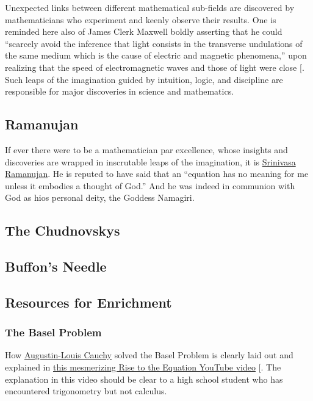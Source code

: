 \documentclass[
  a4paper,
]{article}
\begin{document}
Unexpected links between different mathematical sub-fields are
discovered by mathematicians who experiment and keenly observe their
results. One is reminded here also of James Clerk Maxwell boldly
asserting that he could ``scarcely avoid the inference that light
consists in the transverse undulations of the same medium which is the
cause of electric and magnetic phenomena,'' upon realizing that the
speed of electromagnetic waves and those of light were close
{[}\citeproc{ref-maxwell}{39}{]}. Such leaps of the imagination guided
by intuition, logic, and discipline are responsible for major
discoveries in science and mathematics.

\subsection{Ramanujan}\label{ramanujan}

If ever there were to be a mathematician par excellence, whose insights
and discoveries are wrapped in inscrutable leaps of the imagination, it
is \href{}{Srinivasa Ramanujan}. He is reputed to have said that an
``equation has no meaning for me unless it embodies a thought of God.''
And he was indeed in communion with God as hios personal deity, the
Goddess Namagiri.

\subsection{The Chudnovskys}\label{the-chudnovskys}

\subsection{Buffon's Needle}\label{buffons-needle}

\subsection{Resources for Enrichment}\label{resources-for-enrichment}

\subsubsection{The Basel Problem}\label{the-basel-problem}

How
\href{https://en.wikipedia.org/wiki/Augustin-Louis_Cauchy}{Augustin-Louis
Cauchy} solved the Basel Problem is clearly laid out and explained in
\href{https://www.youtube.com/watch?v=2jgtAo3Ztf}{this mesmerizing Rise
to the Equation YouTube video} {[}\citeproc{ref-cauchy-basel}{40}{]}.
The explanation in this video should be clear to a high school student
who has encountered trigonometry but not calculus.
\end{document}
